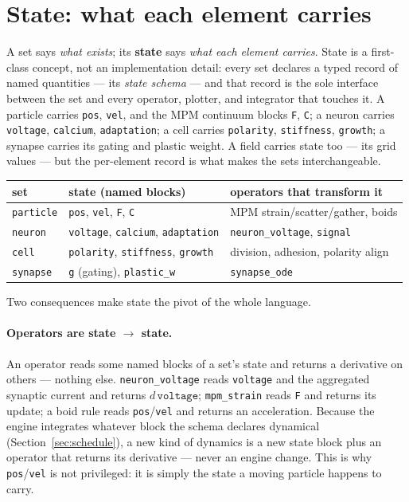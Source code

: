 \documentclass[11pt]{article}
\newcommand{\code}[1]{\texttt{#1}}
\begin{document}
\section{State: what each element carries}
\label{sec:state}

A set says \emph{what exists}; its \textbf{state} says \emph{what each element
carries}. State is a first-class concept, not an implementation detail: every set
declares a typed record of named quantities --- its \emph{state schema} --- and that
record is the sole interface between the set and every operator, plotter, and
integrator that touches it. A particle carries \code{pos}, \code{vel}, and the MPM
continuum blocks \code{F}, \code{C}; a neuron carries \code{voltage}, \code{calcium},
\code{adaptation}; a cell carries \code{polarity}, \code{stiffness}, \code{growth}; a
synapse carries its gating and plastic weight. A field carries state too --- its grid
values --- but the per-element record is what makes the sets interchangeable.

\begin{center}
\footnotesize
\renewcommand{\arraystretch}{1.2}
\begin{tabular}{@{}lll@{}}
\toprule
\textbf{set} & \textbf{state (named blocks)} & \textbf{operators that transform it} \\
\midrule
\code{particle} & \code{pos}, \code{vel}, \code{F}, \code{C}          & MPM strain/scatter/gather, boids \\
\code{neuron}   & \code{voltage}, \code{calcium}, \code{adaptation}   & \code{neuron\_voltage}, \code{signal} \\
\code{cell}     & \code{polarity}, \code{stiffness}, \code{growth}    & division, adhesion, polarity align \\
\code{synapse}  & \code{g} (gating), \code{plastic\_w}                & \code{synapse\_ode} \\
\bottomrule
\end{tabular}
\end{center}

Two consequences make state the pivot of the whole language.

\paragraph{Operators are state $\to$ state.} An operator reads some named blocks of a
set's state and returns a derivative on others --- nothing else.
\code{neuron\_voltage} reads \code{voltage} and the aggregated synaptic current and
returns $d\,\code{voltage}$; \code{mpm\_strain} reads \code{F} and returns its update;
a boid rule reads \code{pos}/\code{vel} and returns an acceleration. Because the
engine integrates whatever block the schema declares dynamical
(Section~\ref{sec:schedule}), a new kind of dynamics is a new state block plus an
operator that returns its derivative --- never an engine change. This is why
\code{pos}/\code{vel} is not privileged: it is simply the state a moving particle
happens to carry.
\end{document}
